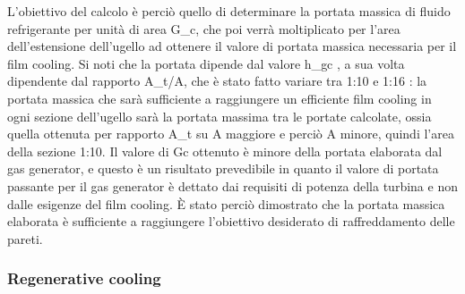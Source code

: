 L'obiettivo del calcolo è perciò quello di determinare la portata massica di fluido refrigerante per unità di area G_c, che poi verrà moltiplicato per l'area dell'estensione dell'ugello ad ottenere il valore di portata massica necessaria per il film cooling. Si noti che la portata dipende dal valore h_{gc} , a sua volta dipendente dal rapporto A_t/A, che è stato fatto variare tra 1:10 e 1:16 : la portata massica che sarà sufficiente a raggiungere un efficiente film cooling in ogni sezione dell'ugello sarà la portata massima tra le portate calcolate, ossia quella ottenuta per rapporto A_t su A maggiore e perciò A minore, quindi l'area della sezione 1:10. Il valore di Gc ottenuto è minore della portata elaborata dal gas generator, e questo è un risultato prevedibile in quanto il valore di portata passante per il gas generator è dettato dai requisiti di potenza della turbina e non dalle esigenze del film cooling. È stato perciò dimostrato che la portata massica elaborata è sufficiente a raggiungere l'obiettivo desiderato di raffreddamento delle pareti.

\subsubsection{Regenerative cooling}
\label{subsubsec:regenerative cooling}

